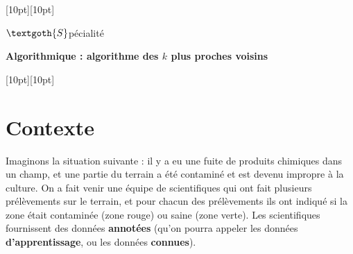 \documentclass[12pt]{article}                   %
\theoremstyle{exercicestyle}
\theoremstyle{break2}
\theoremstyle{break3}
\begin{document}
\noindent\hrulefill
\raisebox{-2.1pt}[10pt][10pt]{\quad\decoone\quad}\hrulefill 

\hfill $\textgoth{S}$pécialité
 \begin{center}{\quad \large{\textbf{ Algorithmique : algorithme des $k$ plus proches voisins }}\; }\end{center}
\vspace{0.5cm}
\noindent
\hrulefill
\raisebox{-16.4pt}[10pt][10pt]{}\hrulefill
\vspace{1cm}

\section*{Contexte}

Imaginons la situation suivante : il y a eu une fuite de produits chimiques dans un champ, et une partie du terrain a été contaminé et est devenu impropre à la culture. On a fait venir une équipe de scientifiques qui ont fait plusieurs prélèvements sur le terrain, et pour chacun des prélèvements ils ont indiqué si la zone était contaminée (zone rouge) ou saine (zone verte). Les scientifiques fournissent des données \textbf{annotées} (qu'on pourra appeler les données \textbf{d'apprentissage}, ou les données \textbf{connues}).
\end{document}
